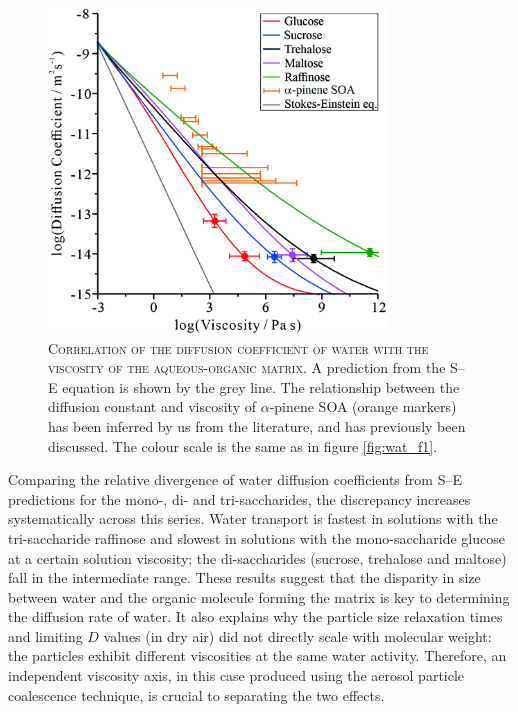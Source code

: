 \begin{figure}
    \centering
    \includegraphics[width=0.8\textwidth]{chapters/water_hopping/figures/f2.png}
    \caption[Correlation of the diffusion coefficient of water with the viscosity of the aqueous-organic matrix]{\textsc{Correlation of the diffusion coefficient of water with the viscosity of the aqueous-organic matrix}.  A prediction from the S–E equation is shown by the grey line. The relationship between the diffusion constant and viscosity of $\alpha$-pinene SOA (orange markers) has been inferred by us from the literature, and has previously been discussed.\cite{Price2015,Chen2013} The colour scale is the same as in figure \ref{fig:wat_f1}.} 
    \label{fig:wat_f2}
\end{figure}

Comparing the relative divergence of water diffusion coefficients from S–E predictions for the mono-, di- and tri-saccharides, the discrepancy increases systematically across this series. Water transport is fastest in solutions with the tri-saccharide raffinose and slowest in solutions with the mono-saccharide glucose at a certain solution viscosity; the di-saccharides (sucrose, trehalose and maltose) fall in the intermediate range. These results suggest that the disparity in size between water and the organic molecule forming the matrix is key to determining the diffusion rate of water. It also explains why the particle size relaxation times and limiting $D$ values (in dry air) did not directly scale with molecular weight: the particles exhibit different viscosities at the same water activity. Therefore, an independent viscosity axis, in this case produced using the aerosol particle coalescence technique, is crucial to separating the two effects.

